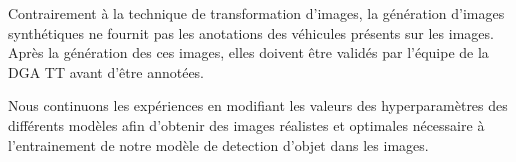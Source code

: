 Contrairement à la technique de transformation d'images, la génération d'images synthétiques ne fournit pas les anotations des véhicules présents sur les images.
Après la génération des ces images, elles doivent être validés par l'équipe de la DGA TT avant d'être annotées.

Nous continuons les expériences en modifiant les valeurs des hyperparamètres des différents modèles afin d'obtenir des images réalistes et optimales nécessaire à l'entrainement de notre modèle de detection d'objet dans les images.


